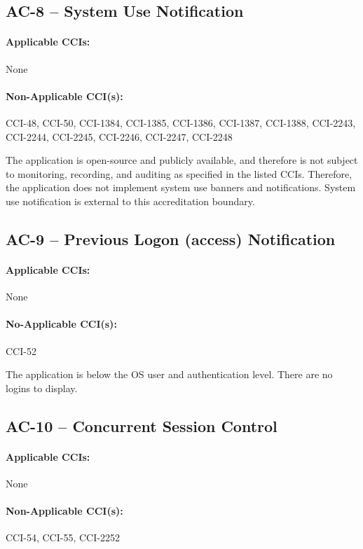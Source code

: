 \documentclass[letterpaper, 10pt, twoside]{article}
\begin{document}
\subsection{AC-8 -- System Use Notification}

\paragraph{Applicable CCIs:} None

\paragraph{Non-Applicable CCI(s):} CCI-48, CCI-50, CCI-1384, CCI-1385, CCI-1386, CCI-1387, CCI-1388, CCI-2243, CCI-2244, CCI-2245, CCI-2246, CCI-2247, CCI-2248

The application is open-source and publicly available, and therefore is not subject to monitoring, recording, and auditing as specified in the listed CCIs. Therefore, the application does not implement system use banners and notifications. System use notification is external to this accreditation boundary.

\subsection{AC-9 -- Previous Logon (access) Notification}

\paragraph{Applicable CCIs:} None

\paragraph{No-Applicable CCI(s):} CCI-52

The application is below the OS user and authentication level. There are no logins to display.

\subsection{AC-10 -- Concurrent Session Control}

\paragraph{Applicable CCIs:} None

\paragraph{Non-Applicable CCI(s):} CCI-54, CCI-55, CCI-2252
\end{document}
